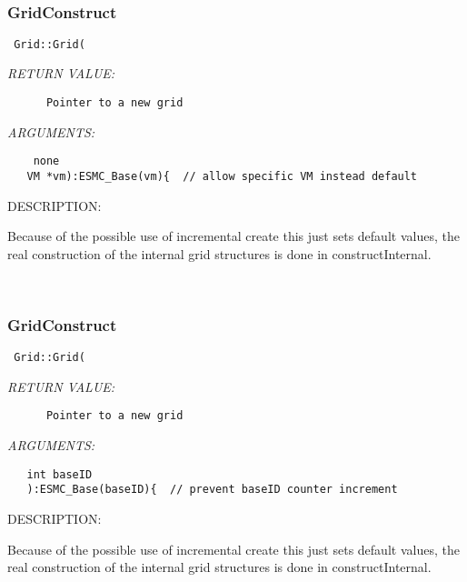  
\mbox{}\hrulefill\
 
\subsubsection [GridConstruct] {GridConstruct}


  
\begin{verbatim} Grid::Grid(\end{verbatim}{\em RETURN VALUE:}
\begin{verbatim}      Pointer to a new grid\end{verbatim}{\em ARGUMENTS:}
\begin{verbatim}    none
   VM *vm):ESMC_Base(vm){  // allow specific VM instead default\end{verbatim}
{\sf DESCRIPTION:\\ }


      Because of the possible use of incremental create this just
      sets default values, the real construction of the internal
      grid structures is done in constructInternal.
   
 
\mbox{}\hrulefill\
 
\subsubsection [GridConstruct] {GridConstruct}


  
\begin{verbatim} Grid::Grid(\end{verbatim}{\em RETURN VALUE:}
\begin{verbatim}      Pointer to a new grid\end{verbatim}{\em ARGUMENTS:}
\begin{verbatim}   int baseID
   ):ESMC_Base(baseID){  // prevent baseID counter increment\end{verbatim}
{\sf DESCRIPTION:\\ }


      Because of the possible use of incremental create this just
      sets default values, the real construction of the internal
      grid structures is done in constructInternal.
   
 
